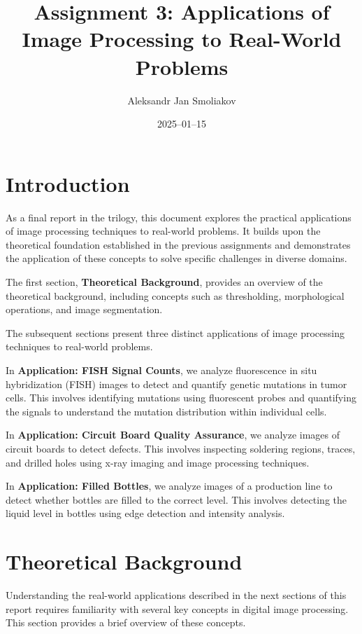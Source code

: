 \documentclass[a4paper,12pt]{article}
\title{Assignment 3: Applications of Image Processing to Real-World Problems}
\author{Aleksandr Jan Smoliakov}
\date{2025--01--15}
\begin{document}
\maketitle

\section{Introduction}

As a final report in the trilogy, this document explores the practical applications of image processing techniques to real-world problems. It builds upon the theoretical foundation established in the previous assignments and demonstrates the application of these concepts to solve specific challenges in diverse domains.

The first section, \textbf{Theoretical Background}, provides an overview of the theoretical background, including concepts such as thresholding, morphological operations, and image segmentation.

The subsequent sections present three distinct applications of image processing techniques to real-world problems.

In \textbf{Application: FISH Signal Counts}, we analyze fluorescence in situ hybridization (FISH) images to detect and quantify genetic mutations in tumor cells. This involves identifying mutations using fluorescent probes and quantifying the signals to understand the mutation distribution within individual cells.

In \textbf{Application: Circuit Board Quality Assurance}, we analyze images of circuit boards to detect defects. This involves inspecting soldering regions, traces, and drilled holes using x-ray imaging and image processing techniques.

In \textbf{Application: Filled Bottles}, we analyze images of a production line to detect whether bottles are filled to the correct level. This involves detecting the liquid level in bottles using edge detection and intensity analysis.

\newpage

\tableofcontents

\newpage

\section{Theoretical Background}

Understanding the real-world applications described in the next sections of this report requires familiarity with several key concepts in digital image processing. This section provides a brief overview of these concepts.
\end{document}
